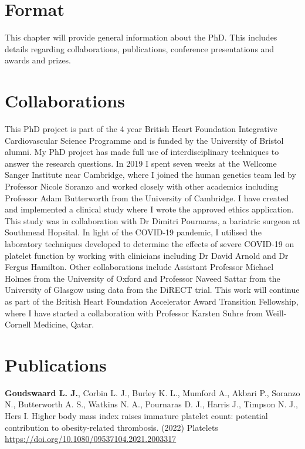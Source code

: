 \documentclass[11pt,twoside]{bristolthesis}
\begin{document}
\hypertarget{format}{%
\section{Format}\label{format}}

This chapter will provide general information about the PhD. This includes details regarding collaborations, publications, conference presentations and awards and prizes.

\hypertarget{collaborations}{%
\section{Collaborations}\label{collaborations}}

This PhD project is part of the 4 year British Heart Foundation Integrative Cardiovascular Science Programme and is funded by the University of Bristol alumni. My PhD project has made full use of interdisciplinary techniques to answer the research questions. In 2019 I spent seven weeks at the Wellcome Sanger Institute near Cambridge, where I joined the human genetics team led by Professor Nicole Soranzo and worked closely with other academics including Professor Adam Butterworth from the University of Cambridge. I have created and implemented a clinical study where I wrote the approved ethics application. This study was in collaboration with Dr Dimitri Pournaras, a bariatric surgeon at Southmead Hopsital. In light of the COVID-19 pandemic, I utilised the laboratory techniques developed to determine the effects of severe COVID-19 on platelet function by working with clinicians including Dr David Arnold and Dr Fergus Hamilton. Other collaborations include Assistant Professor Michael Holmes from the University of Oxford and Professor Naveed Sattar from the University of Glasgow using data from the DiRECT trial. This work will continue as part of the British Heart Foundation Accelerator Award Transition Fellowship, where I have started a collaboration with Professor Karsten Suhre from Weill-Cornell Medicine, Qatar.

\hypertarget{publications}{%
\section{Publications}\label{publications}}

\textbf{Goudswaard L. J.}, Corbin L. J., Burley K. L., Mumford A., Akbari P., Soranzo N., Butterworth A. S., Watkins N. A., Pournaras D. J., Harris J., Timpson N. J., Hers I. Higher body mass index raises immature platelet count: potential contribution to obesity-related thrombosis. (2022) Platelets \url{https://doi.org/10.1080/09537104.2021.2003317}
\end{document}
